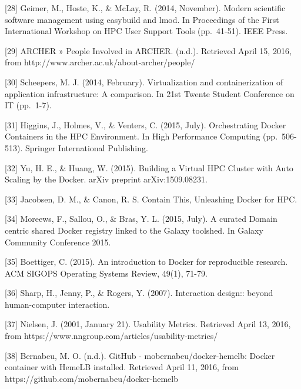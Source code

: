 \documentclass[]{article}
\begin{document}
{[}28{]} Geimer, M., Hoste, K., \& McLay, R. (2014, November). Modern
scientific software management using easybuild and lmod. In Proceedings
of the First International Workshop on HPC User Support Tools
(pp.~41-51). IEEE Press.

{[}29{]} ARCHER » People Involved in ARCHER. (n.d.). Retrieved April 15,
2016, from http://www.archer.ac.uk/about-archer/people/

{[}30{]} Scheepers, M. J. (2014, February). Virtualization and
containerization of application infrastructure: A comparison. In 21st
Twente Student Conference on IT (pp.~1-7).

{[}31{]} Higgins, J., Holmes, V., \& Venters, C. (2015, July).
Orchestrating Docker Containers in the HPC Environment. In High
Performance Computing (pp.~506-513). Springer International Publishing.

{[}32{]} Yu, H. E., \& Huang, W. (2015). Building a Virtual HPC Cluster
with Auto Scaling by the Docker. arXiv preprint arXiv:1509.08231.

{[}33{]} Jacobsen, D. M., \& Canon, R. S. Contain This, Unleashing
Docker for HPC.

{[}34{]} Moreews, F., Sallou, O., \& Bras, Y. L. (2015, July). A curated
Domain centric shared Docker registry linked to the Galaxy toolshed. In
Galaxy Community Conference 2015.

{[}35{]} Boettiger, C. (2015). An introduction to Docker for
reproducible research. ACM SIGOPS Operating Systems Review, 49(1),
71-79.

{[}36{]} Sharp, H., Jenny, P., \& Rogers, Y. (2007). Interaction
design:: beyond human-computer interaction.

{[}37{]} Nielsen, J. (2001, January 21). Usability Metrics. Retrieved
April 13, 2016, from https://www.nngroup.com/articles/usability-metrics/

{[}38{]} Bernabeu, M. O. (n.d.). GitHub - mobernabeu/docker-hemelb:
Docker container with HemeLB installed. Retrieved April 11, 2016, from
https://github.com/mobernabeu/docker-hemelb
\end{document}
